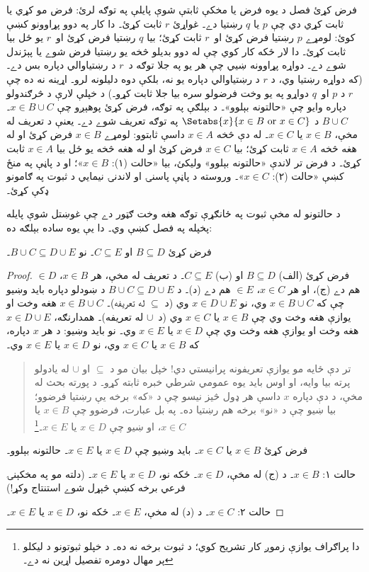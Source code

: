 \documentclass[../../../include/open-logic-section]{subfiles}
\begin{document}
فرض کړئ فصل د يوه فرض يا مخکې ثابتې شوې پايلې
په توګه لرئ: فرض مو کړي يا ثابت کړي دي چې $p$
يا $q$ رښتيا دے۔ غواړئ $r$ ثابت کړئ۔ دا کار
په دوو پړاوونو کښې کوئ: لومړے $p$ رښتيا
فرض کړئ او~$r$ ثابت کړئ؛ بيا $q$ رښتيا
فرض کړئ او~$r$ يو ځل بيا ثابت کړئ۔ دا
لار ځکه کار کوي چې له دوو بديلو څخه
يو رښتيا فرض شوے يا پېژندل شوے دے۔
دواړه پړاوونه ښيي چې هر يو په جلا
توګه د~$r$ د رښتياوالي دپاره بس دے۔
(که دواړه رښتيا وي، د $r$ د رښتياوالي
دپاره يو نه، بلکې دوه دليلونه لرو۔
اړينه نه ده چې $r$ د $p$ او~$q$
دواړو په يو وخت فرضولو سره بيا جلا
ثابت کړو۔) د خپلې لارې د څرګندولو
دپاره وايو چې «حالتونه بېلوو»۔
د بېلګې په توګه، فرض کړئ پوهېږو
چې $x \in B \cup C$۔ $B \cup C$
د $\Setabs{x}{x \in B \text{ or } x \in C}$
په توګه تعريف شوے دے۔ يعنې د تعريف
له مخې، $x \in B$ يا $x \in C$۔
له دې څخه $x \in A$ داسې ثابتوو:
لومړے $x \in B$ فرض کړئ او له هغه
څخه $x \in A$ ثابت کړئ؛ بيا
$x \in C$ فرض کړئ او له هغه
څخه يو ځل بيا $x \in A$ ثابت
کړئ۔ د فرض تر لاندې «حالتونه
بېلوو» وليکئ، بيا «حالت (۱):
$x \in B$»؛ او د پاڼې په منځ
کښې «حالت (۲): $x \in C$»۔
وروسته د پاڼې پاسنۍ او لاندنۍ
نيمايي د ثبوت په ګامونو ډکې کړئ۔

د حالتونو له مخې ثبوت په ځانګړې توګه هغه
وخت ګټور دے چې غوښتل شوې پايله پخپله په
فصل کښې وي۔ دا يې يوه ساده بېلګه ده:

\begin{prop}
فرض کړئ $B \subseteq D$ او $C \subseteq E$۔
نو $B \cup C \subseteq
D \cup E$۔
\end{prop}

\begin{proof}
  فرض کړئ (الف) $B \subseteq D$ او (ب)
  $C \subseteq E$۔ د تعريف له مخې،
  هر $x \in B$، $ \in D$ هم دے
  (ج)، او هر $x \in C$، $ \in E$
  هم دے (د)۔
  د $B \cup C \subseteq D \cup E$
  د ښودلو دپاره بايد وښيو چې که
  $x \in B \cup C$ وي، نو
  $x \in D \cup E$ وي (د
  $\subseteq$ له تعريفه)۔
  $x \in B \cup C$ هغه وخت او
  يوازې هغه وخت وي چې $x \in B$
  يا $x \in C$ وي (د~$\cup$
  له تعريفه)۔ همدارنګه،
  $x \in D \cup E$ هغه وخت او
  يوازې هغه وخت وي چې $x \in D$
  يا $x \in E$ وي۔ نو بايد وښيو:
  د هر $x$ دپاره، که $x \in B$
  يا $x \in C$ وي، نو $x \in D$
  يا $x \in E$ وي۔

  \begin{quote}
  تر دې ځايه مو يوازې تعريفونه پرانيستي
  دي!{} خپل بيان مو د $\subseteq$ او
  $\cup$ له يادولو پرته بيا وايه، او اوس
  بايد يوه عمومي شرطي خبره ثابته کړو۔
  د پورته بحث له مخې، د دې دپاره
  $x$ داسې هر ډول څيز نيسو چې د
  «که» برخه يې رښتيا فرضوو؛ بيا
  ښيو چې د «نو» برخه هم رښتيا ده۔
  په بل عبارت، فرضوو چې $x
  \in B$ يا $x \in C$، او ښيو
  چې $x \in D$ يا $x \in
  E$۔\footnote{دا پراګراف يوازې
    زموږ کار تشريح کوي؛ د ثبوت
    برخه نه ده۔ د خپلو ثبوتونو
    د ليکلو پر مهال دومره تفصيل
    اړين نه دے۔}
  \end{quote}

  فرض کړئ $x \in B$ يا $x \in C$۔
  بايد وښيو چې $x \in D$ يا
  $x \in E$۔ حالتونه بېلوو۔

  حالت ۱: $x \in B$۔ د (ج)
  له مخې، $x \in D$۔ ځکه نو،
  $x \in D$ يا $x \in
  E$۔ (دلته مو په مخکېنۍ
  فرعي برخه کښې څېړل شوے
  استنتاج وکړ!)

  حالت ۲: $x \in C$۔ د (د)
  له مخې، $x \in E$۔ ځکه نو،
  $x \in D$ يا $x \in E$۔
 \end{proof}
\end{document}

